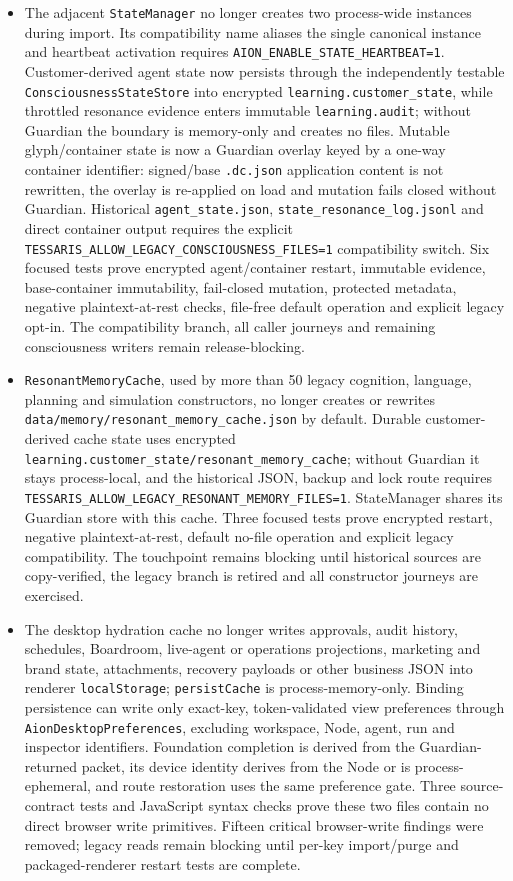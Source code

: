 \documentclass[11pt]{article}
\newcommand{\code}[1]{\texttt{#1}}
\begin{document}
\begin{itemize}
  \item The adjacent \code{StateManager} no longer creates two process-wide instances during import. Its compatibility name aliases the single canonical instance and heartbeat activation requires \code{AION\_ENABLE\_STATE\_HEARTBEAT=1}. Customer-derived agent state now persists through the independently testable \code{ConsciousnessStateStore} into encrypted \code{learning.customer\_state}, while throttled resonance evidence enters immutable \code{learning.audit}; without Guardian the boundary is memory-only and creates no files. Mutable glyph/container state is now a Guardian overlay keyed by a one-way container identifier: signed/base \code{.dc.json} application content is not rewritten, the overlay is re-applied on load and mutation fails closed without Guardian. Historical \code{agent\_state.json}, \code{state\_resonance\_log.jsonl} and direct container output requires the explicit \code{TESSARIS\_ALLOW\_LEGACY\_CONSCIOUSNESS\_FILES=1} compatibility switch. Six focused tests prove encrypted agent/container restart, immutable evidence, base-container immutability, fail-closed mutation, protected metadata, negative plaintext-at-rest checks, file-free default operation and explicit legacy opt-in. The compatibility branch, all caller journeys and remaining consciousness writers remain release-blocking.
  \item \code{ResonantMemoryCache}, used by more than 50 legacy cognition, language, planning and simulation constructors, no longer creates or rewrites \code{data/memory/resonant\_memory\_cache.json} by default. Durable customer-derived cache state uses encrypted \code{learning.customer\_state/resonant\_memory\_cache}; without Guardian it stays process-local, and the historical JSON, backup and lock route requires \code{TESSARIS\_ALLOW\_LEGACY\_RESONANT\_MEMORY\_FILES=1}. StateManager shares its Guardian store with this cache. Three focused tests prove encrypted restart, negative plaintext-at-rest, default no-file operation and explicit legacy compatibility. The touchpoint remains blocking until historical sources are copy-verified, the legacy branch is retired and all constructor journeys are exercised.
  \item The desktop hydration cache no longer writes approvals, audit history, schedules, Boardroom, live-agent or operations projections, marketing and brand state, attachments, recovery payloads or other business JSON into renderer \code{localStorage}; \code{persistCache} is process-memory-only. Binding persistence can write only exact-key, token-validated view preferences through \code{AionDesktopPreferences}, excluding workspace, Node, agent, run and inspector identifiers. Foundation completion is derived from the Guardian-returned packet, its device identity derives from the Node or is process-ephemeral, and route restoration uses the same preference gate. Three source-contract tests and JavaScript syntax checks prove these two files contain no direct browser write primitives. Fifteen critical browser-write findings were removed; legacy reads remain blocking until per-key import/purge and packaged-renderer restart tests are complete.

\end{itemize}
\end{document}
